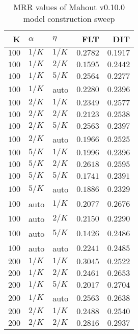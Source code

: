 
\begin{table}
\begin{spacing}{1.2}
\centering
\caption{MRR values of Mahout v0.10.0 model construction sweep}
\label{table:mahout_model_sweep}
\vspace{0.2em}
\parbox{.45\linewidth}{\centering \begin{tabular}{rll|rr}
\toprule
    K &  $\alpha$ &    $\eta$ & FLT &   DIT \\
\midrule
$100$ &  $1/K$ &  $1/K$ &         $0.2782$ & $0.1917$ \\
$100$ &  $1/K$ &  $2/K$ &         $0.1595$ & $0.2442$ \\
$100$ &  $1/K$ &  $5/K$ &         $0.2564$ & $0.2277$ \\
$100$ &  $1/K$ &   auto &         $0.2280$ & $0.2396$ \\
$100$ &  $2/K$ &  $1/K$ &         $0.2349$ & $0.2577$ \\
$100$ &  $2/K$ &  $2/K$ &         $0.2123$ & $0.2538$ \\
$100$ &  $2/K$ &  $5/K$ &         $0.2563$ & $0.2397$ \\
$100$ &  $2/K$ &   auto &         $0.1966$ & $0.2525$ \\
$100$ &  $5/K$ &  $1/K$ &         $0.1996$ & $0.2396$ \\
$100$ &  $5/K$ &  $2/K$ &         $0.2618$ & $0.2595$ \\
$100$ &  $5/K$ &  $5/K$ &         $0.1741$ & $0.2391$ \\
$100$ &  $5/K$ &   auto &         $0.1886$ & $0.2329$ \\
$100$ &   auto &  $1/K$ &         $0.2077$ & $0.2676$ \\
$100$ &   auto &  $2/K$ &         $0.2150$ & $0.2290$ \\
$100$ &   auto &  $5/K$ &         $0.1426$ & $0.2486$ \\
$100$ &   auto &   auto &         $0.2241$ & $0.2485$ \\
$200$ &  $1/K$ &  $1/K$ &         $0.3045$ & $0.2522$ \\
$200$ &  $1/K$ &  $2/K$ &         $0.2461$ & $0.2653$ \\
$200$ &  $1/K$ &  $5/K$ &         $0.2017$ & $0.2704$ \\
$200$ &  $1/K$ &   auto &         $0.2563$ & $0.2638$ \\
$200$ &  $2/K$ &  $1/K$ &         $0.2488$ & $0.2540$ \\
$200$ &  $2/K$ &  $2/K$ &         $0.2816$ & $0.2937$ \\

\end{tabular}}
\end{spacing}
\end{table}
